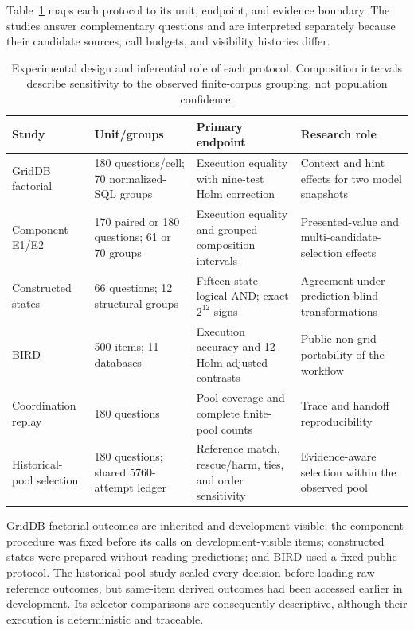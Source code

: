 \documentclass[applsci,article,submit,moreauthors]{Definitions/mdpi}
\begin{document}
Table~\ref{tab:protocol-master} maps each protocol to its unit, endpoint, and evidence boundary. The studies answer complementary questions and are interpreted separately because their candidate sources, call budgets, and visibility histories differ.

\begin{table}[htbp]
\caption{Experimental design and inferential role of each protocol. Composition intervals describe sensitivity to the observed finite-corpus grouping, not population confidence.}
\label{tab:protocol-master}\centering\scriptsize
\setlength{\tabcolsep}{3pt}
\begin{tabular}{p{2.3cm}p{2.6cm}p{3.2cm}p{4.3cm}}
\toprule
Study & Unit/groups & Primary endpoint & Research role\\
\midrule
GridDB factorial & 180 questions/cell; 70 normalized-SQL groups & Execution equality with nine-test Holm correction & Context and hint effects for two model snapshots\\
Component E1/E2 & 170 paired or 180 questions; 61 or 70 groups & Execution equality and grouped composition intervals & Presented-value and multi-candidate-selection effects\\
Constructed states & 66 questions; 12 structural groups & Fifteen-state logical AND; exact $2^{12}$ signs & Agreement under prediction-blind transformations\\
BIRD & 500 items; 11 databases & Execution accuracy and 12 Holm-adjusted contrasts & Public non-grid portability of the workflow\\
Coordination replay & 180 questions & Pool coverage and complete finite-pool counts & Trace and handoff reproducibility\\
Historical-pool selection & 180 questions; shared 5760-attempt ledger & Reference match, rescue/harm, ties, and order sensitivity & Evidence-aware selection within the observed pool\\
\bottomrule
\end{tabular}
\end{table}

GridDB factorial outcomes are inherited and development-visible; the component procedure was fixed before its calls on development-visible items; constructed states were prepared without reading predictions; and BIRD used a fixed public protocol. The historical-pool study sealed every decision before loading raw reference outcomes, but same-item derived outcomes had been accessed earlier in development. Its selector comparisons are consequently descriptive, although their execution is deterministic and traceable.
\end{document}
